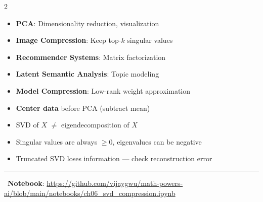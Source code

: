\documentclass[11pt,letterpaper]{article}
\begin{document}
\begin{multicols}{2}
\begin{center}
\end{center}

\begin{tcolorbox}[appbox, title={\faRobot\ ML Applications}]
\begin{itemize}
    \item \textbf{PCA}: Dimensionality reduction, visualization
    \item \textbf{Image Compression}: Keep top-$k$ singular values
    \item \textbf{Recommender Systems}: Matrix factorization
    \item \textbf{Latent Semantic Analysis}: Topic modeling
    \item \textbf{Model Compression}: Low-rank weight approximation
\end{itemize}
\end{tcolorbox}

\begin{tcolorbox}[warningbox, title={\faExclamationTriangle\ Common Pitfalls}]
\begin{itemize}
    \item \textbf{Center data} before PCA (subtract mean)
    \item SVD of $X$ $\neq$ eigendecomposition of $X$
    \item Singular values are always $\geq 0$, eigenvalues can be negative
    \item Truncated SVD loses information --- check reconstruction error
\end{itemize}
\end{tcolorbox}

\end{multicols}

\vspace{5pt}
\hrule
\vspace{5pt}

\begin{center}
\faGithub\ \textbf{Notebook}: \url{https://github.com/vijaygwu/math-powers-ai/blob/main/notebooks/ch06_svd_compression.ipynb}
\end{center}
\end{document}
